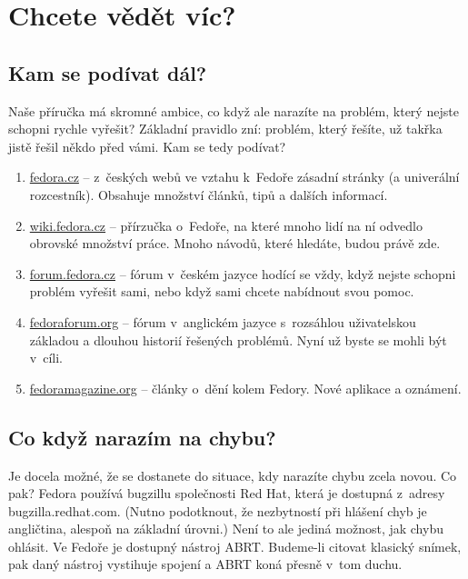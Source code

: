 \chapter*{Chcete vědět víc?}
\section*{Kam se podívat dál?}
Naše příručka má skromné ambice, co když ale narazíte na problém, který nejste schopni rychle vyřešit? Základní pravidlo zní: problém, který řešíte, už takřka jistě řešil někdo před vámi. Kam se tedy podívat?
\begin{enumerate}
\item \url{fedora.cz} -- z~českých webů ve vztahu k~Fedoře zásadní stránky (a univerální rozcestník). Obsahuje množství článků, tipů a dalších informací.
\item \url{wiki.fedora.cz} -- přírzučka o~Fedoře, na které mnoho lidí na ní odvedlo obrovské množství práce. Mnoho návodů, které hledáte, budou právě zde.
\item \url{forum.fedora.cz} -- fórum v~českém jazyce hodící se vždy, když nejste schopni problém vyřešit sami, nebo když sami chcete nabídnout svou pomoc.
\item \url{fedoraforum.org} -- fórum v~anglickém jazyce s~rozsáhlou uživatelskou základou a dlouhou historií řešených problémů. Nyní už byste se mohli být v~cíli.
\item \url{fedoramagazine.org} -- články o~dění kolem Fedory. Nové aplikace a oznámení.
\end{enumerate}
\section*{Co když narazím na chybu?}
Je docela možné, že se dostanete do situace, kdy narazíte chybu zcela novou. Co pak? Fedora používá bugzillu společnosti Red Hat, která je dostupná z~adresy bugzilla.redhat.com. (Nutno podotknout, že nezbytností při hlášení chyb je angličtina, alespoň na základní úrovni.) Není to ale jediná možnost, jak chybu ohlásit. Ve Fedoře je dostupný nástroj ABRT. Budeme-li citovat klasický snímek, pak daný nástroj vystihuje spojení  a ABRT koná přesně v~tom duchu.

